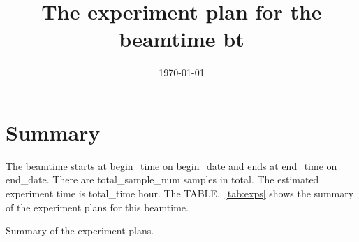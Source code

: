 \documentclass[prl,aps,tighten,amsmath,amssymb,floatfix]{revtex4-1}
\begin{document}
\title{The experiment plan for the beamtime {{bt}}}
\date{\today}
\maketitle

\section{Summary}
The beamtime starts at {{begin_time}} on {{begin_date}} and ends at {{end_time}} on {{end_date}}.
There are {{total_sample_num}} samples in total.
The estimated experiment time is {{total_time}} hour.
The TABLE.~\ref{tab:exps} shows the summary of the experiment plans for this beamtime.

\begin{table}[htpb]
\caption{Summary of the experiment plans.}
\label{tab:exps}
\end{table}
\end{document}
